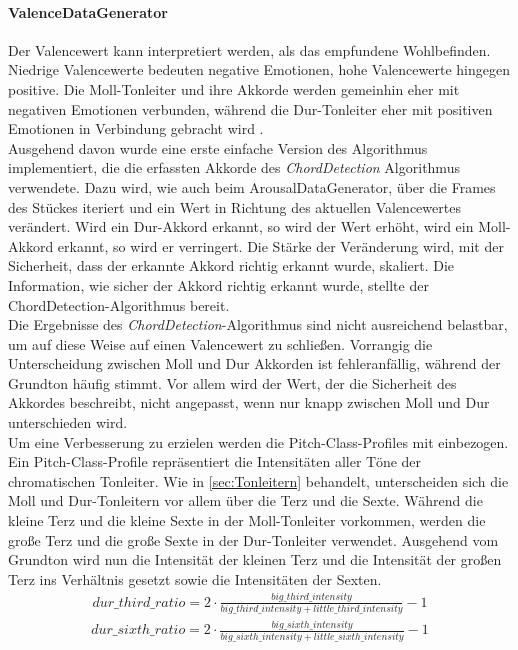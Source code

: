 \documentclass[11pt,a4paper]{article}
\begin{document}
\paragraph{ValenceDataGenerator}
Der Valencewert kann interpretiert werden, als das empfundene Wohlbefinden. Niedrige Valencewerte bedeuten negative Emotionen, hohe Valencewerte hingegen positive. Die Moll-Tonleiter und ihre Akkorde werden gemeinhin eher mit negativen Emotionen verbunden, während die Dur-Tonleiter eher mit positiven Emotionen in Verbindung gebracht wird \cite{dalla2001developmental}.\\
Ausgehend davon wurde eine erste einfache Version des Algorithmus implementiert, die die erfassten Akkorde des \textit{ChordDetection} Algorithmus verwendete. Dazu wird, wie auch beim ArousalDataGenerator, über die Frames des Stückes iteriert und ein Wert in Richtung des aktuellen Valencewertes verändert. Wird ein Dur-Akkord erkannt, so wird der Wert erhöht, wird ein Moll-Akkord erkannt, so wird er verringert. Die Stärke der Veränderung wird, mit der Sicherheit, dass der erkannte Akkord richtig erkannt wurde, skaliert. Die Information, wie sicher der Akkord richtig erkannt wurde, stellte der ChordDetection-Algorithmus bereit.\\
Die Ergebnisse des \textit{ChordDetection}-Algorithmus sind nicht ausreichend belastbar, um auf diese Weise auf einen Valencewert zu schließen. Vorrangig die Unterscheidung zwischen Moll und Dur Akkorden ist fehleranfällig, während der Grundton häufig stimmt. Vor allem wird der Wert, der die Sicherheit des Akkordes beschreibt, nicht angepasst, wenn nur knapp zwischen Moll und Dur unterschieden wird.\\
Um eine Verbesserung zu erzielen werden die Pitch-Class-Profiles mit einbezogen. Ein Pitch-Class-Profile repräsentiert die Intensitäten aller Töne der chromatischen Tonleiter. Wie in \ref{sec:Tonleitern} behandelt, unterscheiden sich die Moll und Dur-Tonleitern vor allem über die Terz und die Sexte. Während die kleine Terz und die kleine Sexte in der Moll-Tonleiter vorkommen, werden die große Terz und die große Sexte in der Dur-Tonleiter verwendet. Ausgehend vom Grundton wird nun die Intensität der kleinen Terz und die Intensität der großen Terz ins Verhältnis gesetzt sowie die Intensitäten der Sexten.
\begin{align}
dur\_third\_ratio = 2 \cdot \frac{big\_third\_intensity}{big\_third\_intensity + little\_third\_intensity} - 1
\end{align}
\begin{align}
dur\_sixth\_ratio = 2 \cdot \frac{big\_sixth\_intensity}{big\_sixth\_intensity + little\_sixth\_intensity}- 1
\end{align}
\end{document}
